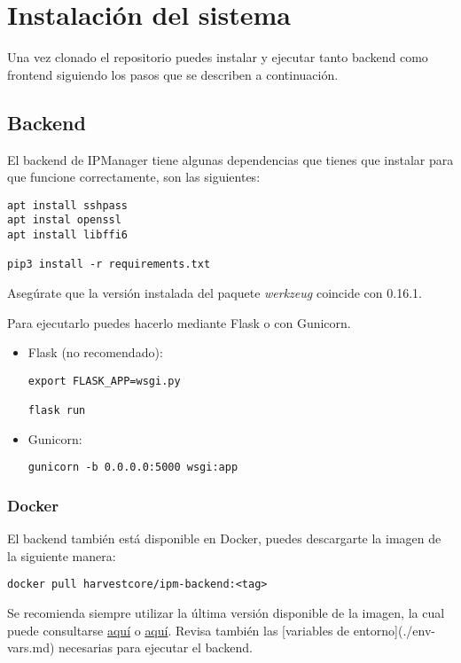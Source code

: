 \chapter{Instalación del sistema}

Una vez clonado el repositorio puedes instalar y ejecutar tanto backend como frontend siguiendo los pasos que se describen a continuación.

\section{Backend}
El backend de IPManager tiene algunas dependencias que tienes que instalar para que funcione correctamente, son las siguientes:

\begin{lstlisting}
apt install sshpass
apt instal openssl
apt install libffi6

pip3 install -r requirements.txt
\end{lstlisting}

Asegúrate que la versión instalada del paquete \textit{werkzeug} coincide con 0.16.1.

Para ejecutarlo puedes hacerlo mediante Flask o con Gunicorn.

\begin{itemize}
	\item Flask (no recomendado):
\begin{lstlisting}
export FLASK_APP=wsgi.py

flask run
\end{lstlisting}
	
	\item Gunicorn:
\begin{lstlisting}
gunicorn -b 0.0.0.0:5000 wsgi:app
\end{lstlisting}
	
\end{itemize}

\subsection{Docker}
El backend también está disponible en Docker, puedes descargarte la imagen de la siguiente manera:

\begin{lstlisting}
docker pull harvestcore/ipm-backend:<tag>
\end{lstlisting}

Se recomienda siempre utilizar la última versión disponible de la imagen, la cual puede consultarse \href{https://github.com/harvestcore/tfg/releases}{aquí} o \href{https://hub.docker.com/r/harvestcore/ipm-backend/tags}{aquí}. Revisa también las [variables de entorno](./env-vars.md) necesarias para ejecutar el backend.

